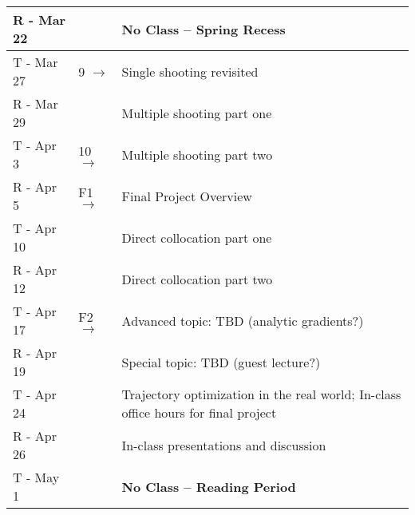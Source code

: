 \documentclass[onecolumn]{article}
\newcommand{\ra}{$\rightarrow$}
\begin{document}
\begin{table}
\begin{tabular}{l|l|l}
    R - Mar 22 &       & \textbf{No Class -- Spring Recess} \\
    \hline
    T - Mar 27 &  9 \ra & Single shooting revisited \\
    R - Mar 29 &        & Multiple shooting part one \\
    T - Apr 3  & 10 \ra & Multiple shooting part two \\
    \hline
    R - Apr 5  & F1 \ra & Final Project Overview \\
    T - Apr 10 &                 & Direct collocation part one \\
    \hline
    R - Apr 12 &        & Direct collocation part two \\
    T - Apr 17 & F2 \ra & Advanced topic: TBD  (analytic gradients?) \\
    \hline
    R - Apr 19 &        & Special topic:  TBD  (guest lecture?) \\
    T - Apr 24 &        & Trajectory optimization in the real world; In-class office hours for final project \\
    R - Apr 26 &        & In-class presentations and discussion \\
    T - May 1  &        & \textbf{No Class -- Reading Period} \\
    \hline
    \end{tabular}
\end{table}



\end{document}
